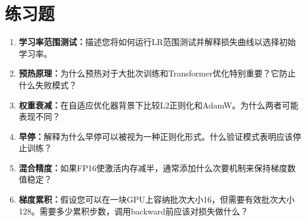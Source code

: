 \section{练习题}

\begin{enumerate}
    \item \textbf{学习率范围测试：}描述您将如何运行LR范围测试并解释损失曲线以选择初始学习率。

    \item \textbf{预热原理：}为什么预热对于大批次训练和Transformer优化特别重要？它防止什么失败模式？

    \item \textbf{权重衰减：}在自适应优化器背景下比较L2正则化和AdamW。为什么两者可能表现不同？

    \item \textbf{早停：}解释为什么早停可以被视为一种正则化形式。什么验证模式表明应该停止训练？

    \item \textbf{混合精度：}如果FP16使激活内存减半，通常添加什么次要机制来保持梯度数值稳定？

    \item \textbf{梯度累积：}假设您可以在一块GPU上容纳批次大小16，但需要有效批次大小128。需要多少累积步数，调用backward前应该对损失做什么？
\end{enumerate}

